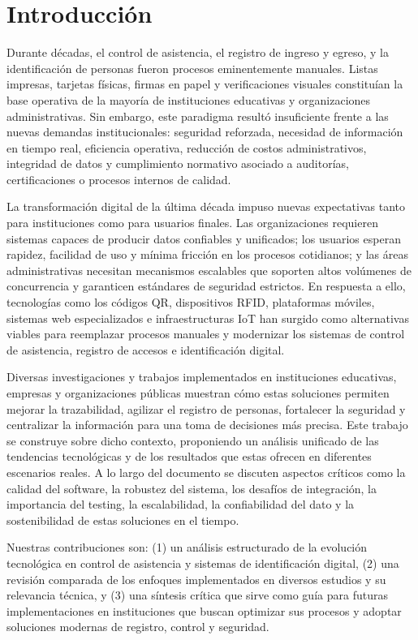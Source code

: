 \section{Introducción}
Durante décadas, el control de asistencia, el registro de ingreso y egreso, y la identificación de personas fueron procesos eminentemente manuales. Listas impresas, tarjetas físicas, firmas en papel y verificaciones visuales constituían la base operativa de la mayoría de instituciones educativas y organizaciones administrativas. Sin embargo, este paradigma resultó insuficiente frente a las nuevas demandas institucionales: seguridad reforzada, necesidad de información en tiempo real, eficiencia operativa, reducción de costos administrativos, integridad de datos y cumplimiento normativo asociado a auditorías, certificaciones o procesos internos de calidad.

La transformación digital de la última década impuso nuevas expectativas tanto para instituciones como para usuarios finales. Las organizaciones requieren sistemas capaces de producir datos confiables y unificados; los usuarios esperan rapidez, facilidad de uso y mínima fricción en los procesos cotidianos; y las áreas administrativas necesitan mecanismos escalables que soporten altos volúmenes de concurrencia y garanticen estándares de seguridad estrictos. En respuesta a ello, tecnologías como los códigos QR, dispositivos RFID, plataformas móviles, sistemas web especializados e infraestructuras IoT han surgido como alternativas viables para reemplazar procesos manuales y modernizar los sistemas de control de asistencia, registro de accesos e identificación digital.

Diversas investigaciones y trabajos implementados en instituciones educativas, empresas y organizaciones públicas muestran cómo estas soluciones permiten mejorar la trazabilidad, agilizar el registro de personas, fortalecer la seguridad y centralizar la información para una toma de decisiones más precisa. Este trabajo se construye sobre dicho contexto, proponiendo un análisis unificado de las tendencias tecnológicas y de los resultados que estas ofrecen en diferentes escenarios reales. A lo largo del documento se discuten aspectos críticos como la calidad del software, la robustez del sistema, los desafíos de integración, la importancia del testing, la escalabilidad, la confiabilidad del dato y la sostenibilidad de estas soluciones en el tiempo.

Nuestras contribuciones son: (1) un análisis estructurado de la evolución tecnológica en control de asistencia y sistemas de identificación digital, (2) una revisión comparada de los enfoques implementados en diversos estudios y su relevancia técnica, y (3) una síntesis crítica que sirve como guía para futuras implementaciones en instituciones que buscan optimizar sus procesos y adoptar soluciones modernas de registro, control y seguridad.

